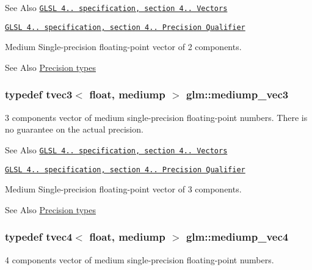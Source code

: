 \begin{DoxySeeAlso}{See Also}
\href{http://www.opengl.org/registry/doc/GLSLangSpec.4.20.8.pdf}{\tt G\-L\-S\-L 4.. specification, section 4.. Vectors} 

\href{http://www.opengl.org/registry/doc/GLSLangSpec.4.20.8.pdf}{\tt G\-L\-S\-L 4.. specification, section 4.. Precision Qualifier}
\end{DoxySeeAlso}
Medium Single-\/precision floating-\/point vector of 2 components. \begin{DoxySeeAlso}{See Also}
\hyperlink{group__core__precision}{Precision types} 
\end{DoxySeeAlso}
\hypertarget{group__core__precision_gac76bf24aca62ca13269d262121d04ceb}{
\subsubsection[{mediump\-\_\-vec3}]{\setlength{\rightskip}{0pt plus 5cm}typedef tvec3$<$ float, mediump $>$ {\bf glm\-::mediump\-\_\-vec3}}}\label{group__core__precision_gac76bf24aca62ca13269d262121d04ceb}
3 components vector of medium single-\/precision floating-\/point numbers. There is no guarantee on the actual precision.

\begin{DoxySeeAlso}{See Also}
\href{http://www.opengl.org/registry/doc/GLSLangSpec.4.20.8.pdf}{\tt G\-L\-S\-L 4.. specification, section 4.. Vectors} 

\href{http://www.opengl.org/registry/doc/GLSLangSpec.4.20.8.pdf}{\tt G\-L\-S\-L 4.. specification, section 4.. Precision Qualifier}
\end{DoxySeeAlso}
Medium Single-\/precision floating-\/point vector of 3 components. \begin{DoxySeeAlso}{See Also}
\hyperlink{group__core__precision}{Precision types} 
\end{DoxySeeAlso}
\hypertarget{group__core__precision_ga3e0bdf70b43f0c2863ad9f0fe7da9476}{
\subsubsection[{mediump\-\_\-vec4}]{\setlength{\rightskip}{0pt plus 5cm}typedef tvec4$<$ float, mediump $>$ {\bf glm\-::mediump\-\_\-vec4}}}\label{group__core__precision_ga3e0bdf70b43f0c2863ad9f0fe7da9476}
4 components vector of medium single-\/precision floating-\/point numbers.

